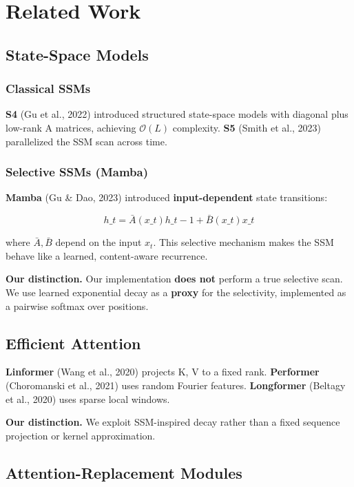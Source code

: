 \section{Related Work}

\subsection{State-Space Models}

\subsubsection{Classical SSMs}

\textbf{S4} (Gu et al., 2022) introduced structured state-space models with 
diagonal plus low-rank A matrices, achieving $\mathcal{O}(L)$ complexity. 
\textbf{S5} (Smith et al., 2023) parallelized the SSM scan across time.

\subsubsection{Selective SSMs (Mamba)}

\textbf{Mamba} (Gu \& Dao, 2023) introduced \textbf{input-dependent} state transitions:

\[
h\_t = \bar{A}(x\_t) h\_{t-1} + \bar{B}(x\_t) x\_t
\tag{2.1}
\]

where $\bar{A}, \bar{B}$ depend on the input $x_t$. This selective mechanism 
makes the SSM behave like a learned, content-aware recurrence.

\textbf{Our distinction.} Our implementation \textbf{does not} perform a true selective 
scan. We use learned exponential decay as a \textbf{proxy} for the selectivity, 
implemented as a pairwise softmax over positions.

\subsection{Efficient Attention}

\textbf{Linformer} (Wang et al., 2020) projects K, V to a fixed rank. 
\textbf{Performer} (Choromanski et al., 2021) uses random Fourier features. 
\textbf{Longformer} (Beltagy et al., 2020) uses sparse local windows.

\textbf{Our distinction.} We exploit SSM-inspired decay rather than a fixed 
sequence projection or kernel approximation.

\subsection{Attention-Replacement Modules}

